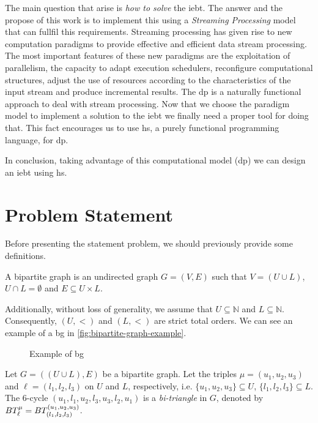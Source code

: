 The main question that arise is \emph{how to solve} the \acrshort{iebt}. The answer and the propose of this work is to implement this using a \emph{Streaming Processing} model that can fullfil this requirements.
Streaming processing has given rise to new computation paradigms to provide effective and efficient data stream processing.
The most important features of these new paradigms are the exploitation of parallelism, the capacity to adapt execution schedulers, 
reconfigure computational structures, adjust the use of resources according to the characteristics of the input stream and produce incremental results. 
The \acrfull{dp} is a naturally functional approach to deal with stream processing. 
Now that we choose the paradigm model to implement a solution to the \acrshort{iebt} we finally need a proper tool for doing that. 
This fact encourages us to use \acrlong{hs}, a purely functional programming language, for \acrshort{dp}.

In conclusion, taking advantage of this computational model (\acrshort{dp}) we can design an \acrshort{iebt} using \acrshort{hs}.

\section{Problem Statement}
Before presenting the statement problem, we should previously provide some definitions.

\begin{definition}[\acrlong{bg}] 
A bipartite graph is an undirected graph $G=(V,E)$  such that $V=(U\cup L)$, $U\cap L=\emptyset$ and $E\subseteq U\times L$.\cite{Bondy1976}
\end{definition}

Additionally, without loss of generality, we assume that  $U\subseteq \mathbb{N}$ and $L\subseteq \mathbb{N}$. Consequently, $(U,<)$  and $(L,<)$ are strict total orders. We can see an example of a \acrshort{bg}
in \autoref{fig:bipartite-graph-example}.

\begin{figure}[ht]
\centering	
{}
\caption[Example of \acrshort{bg}]{Example of \acrshort{bg}}
\label{fig:bipartite-graph-example}
\end{figure}

%
\begin{definition}[\acrlong{bt}]\label{def:bt}
Let $G=((U\cup L),E)$ be a bipartite graph. Let the triples $\mu=(u_1, u_2, u_3)$ and $\ell=(l_1, l_2,l_3)$ on $U$ and $L$, respectively, i.e.  $\{u_1, u_2, u_3\} \subseteq U$, $\{l_1, l_2,l_3\} \subseteq L$. 
The 6-cycle $(u_1,l_1,u_2,l_3,u_3,l_2,u_1)$  is a \textit{bi-triangle} in $G$, denoted by $BT_{\ell}^{\mu} = BT_{(l_1, l_2,l_3)}^{(u_1, u_2, u_3)}$. 
\end{definition}

